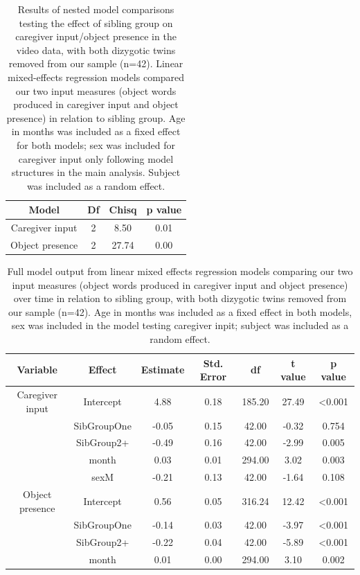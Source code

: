 \documentclass[
  man,mask,floatsintext]{apa6}
\begin{document}
\begin{longtable}[t]{cccc}
\caption{\label{tab:table-model-comparisons-no-twins}Results of nested model comparisons testing the effect of sibling group on caregiver input/object presence in the video data, with both dizygotic twins removed from our sample (n=42). Linear mixed-effects regression models compared our two input measures (object words produced in caregiver input  and object presence) in relation to sibling group. Age in months was included as a fixed effect for both models; sex was included for caregiver input only following model structures in the main analysis. Subject was included as a random effect.}\\
\toprule
Model & Df & Chisq & p value\\
\midrule
Caregiver input & 2 & 8.50 & 0.01\\
Object presence & 2 & 27.74 & 0.00\\
\bottomrule
\end{longtable}

\begin{longtable}[t]{ccccccc}
\caption{\label{tab:table-input-model-summary-no-twins}Full model output from linear mixed effects regression models comparing our two input measures (object words produced in caregiver input and object presence) over time in relation to sibling group, with both dizygotic twins removed from our sample (n=42). Age in months was included as a fixed effect in both models, sex was included in the model testing caregiver inpit; subject was included as a random effect.}\\
\toprule
Variable & Effect & Estimate & Std. Error & df & t value & p value\\
\midrule
Caregiver input & Intercept & 4.88 & 0.18 & 185.20 & 27.49 & <0.001\\
 & SibGroupOne & -0.05 & 0.15 & 42.00 & -0.32 & 0.754\\
 & SibGroup2+ & -0.49 & 0.16 & 42.00 & -2.99 & 0.005\\
 & month & 0.03 & 0.01 & 294.00 & 3.02 & 0.003\\
 & sexM & -0.21 & 0.13 & 42.00 & -1.64 & 0.108\\
\midrule
\addlinespace
Object presence & Intercept & 0.56 & 0.05 & 316.24 & 12.42 & <0.001\\
 & SibGroupOne & -0.14 & 0.03 & 42.00 & -3.97 & <0.001\\
 & SibGroup2+ & -0.22 & 0.04 & 42.00 & -5.89 & <0.001\\
 & month & 0.01 & 0.00 & 294.00 & 3.10 & 0.002\\
\bottomrule
\end{longtable}
\end{document}
